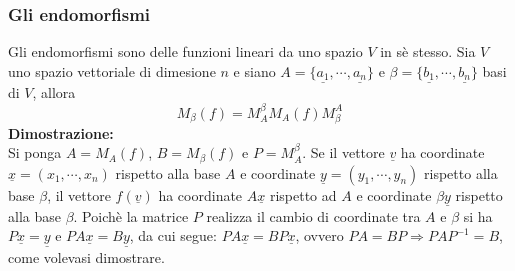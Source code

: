 \subsubsection{Gli endomorfismi}
Gli endomorfismi sono delle funzioni lineari da uno spazio $V$ in s\`e stesso. Sia $V$ uno spazio vettoriale di dimesione $n$ e siano $A=\{\underline{a_1},\cdots,\underline{a_n}
\}$ e $\beta=\{\underline{b_1},\cdots,\underline{b_n}\}$ basi di $V$, allora 
\begin{equation}
M_\beta(f)=M_A^\beta M_A(f)M_\beta^A
\end{equation}
\textbf{Dimostrazione:}\\
Si ponga $A=M_A(f)$, $B=M_\beta(f)$ e $P=M_A^\beta$. Se il vettore $\underline{v}$ ha coordinate $\underline{x}=(x_1,\cdots,x_n)$ rispetto alla base $A$ e coordinate 
$\underline{y}=(y_1,\cdots,y_n)$ rispetto alla base $\beta$, il vettore $f(\underline{v})$ ha coordinate $A\underline{x}$ rispetto ad $A$ e coordinate $\beta\underline{y}$ 
rispetto alla base $\beta$. Poich\`e la matrice $P$ realizza il cambio di coordinate tra $A$ e $\beta$ si ha $P\underline{x}=\underline{y}$ e $PA\underline{x}=B\underline{y}$, 
da cui segue: $PA\underline{x}=BP\underline{x}$, ovvero $PA=BP\Rightarrow PAP^{-1}=B$, come volevasi dimostrare.